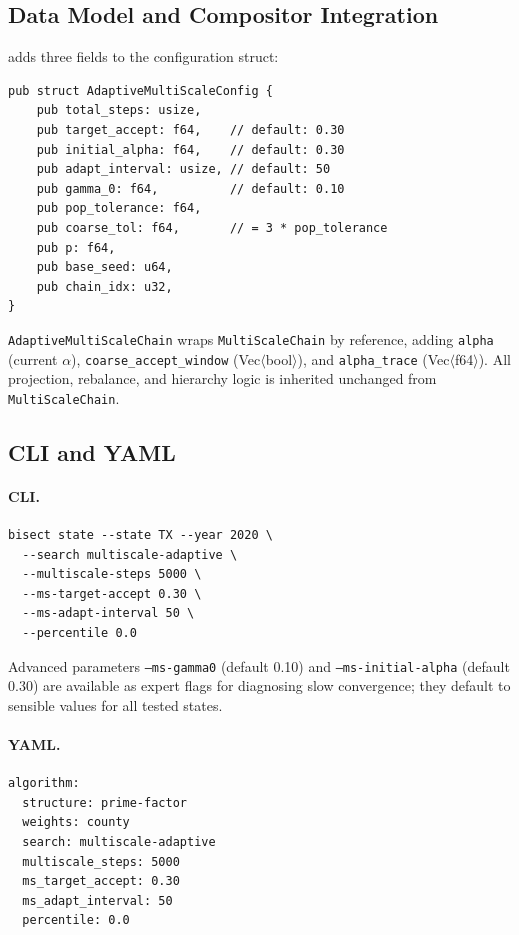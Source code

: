 \subsection{Data Model and Compositor Integration}

\ams{} adds three fields to the \ms{} configuration struct:

\begin{verbatim}
pub struct AdaptiveMultiScaleConfig {
    pub total_steps: usize,
    pub target_accept: f64,    // default: 0.30
    pub initial_alpha: f64,    // default: 0.30
    pub adapt_interval: usize, // default: 50
    pub gamma_0: f64,          // default: 0.10
    pub pop_tolerance: f64,
    pub coarse_tol: f64,       // = 3 * pop_tolerance
    pub p: f64,
    pub base_seed: u64,
    pub chain_idx: u32,
}
\end{verbatim}

\noindent
\texttt{AdaptiveMultiScaleChain} wraps \texttt{MultiScaleChain} by reference,
adding \texttt{alpha} (current $\alpha$), \texttt{coarse\_accept\_window}
(Vec$\langle$bool$\rangle$), and \texttt{alpha\_trace} (Vec$\langle$f64$\rangle$).
All projection, rebalance, and hierarchy logic is inherited unchanged from
\texttt{MultiScaleChain}.

\subsection{CLI and YAML}

\paragraph{CLI.}
\begin{verbatim}
bisect state --state TX --year 2020 \
  --search multiscale-adaptive \
  --multiscale-steps 5000 \
  --ms-target-accept 0.30 \
  --ms-adapt-interval 50 \
  --percentile 0.0
\end{verbatim}

Advanced parameters \texttt{--ms-gamma0} (default 0.10) and
\texttt{--ms-initial-alpha} (default 0.30) are available as expert flags for
diagnosing slow convergence; they default to sensible values for all tested
states.

\paragraph{YAML.}
\begin{verbatim}
algorithm:
  structure: prime-factor
  weights: county
  search: multiscale-adaptive
  multiscale_steps: 5000
  ms_target_accept: 0.30
  ms_adapt_interval: 50
  percentile: 0.0
\end{verbatim}

